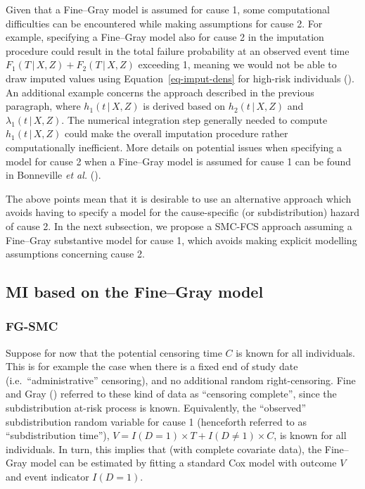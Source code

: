 \documentclass[
  letterpaper,
  paper=240mm:170mm,
  twoside=true,
  open=right,
  fontsize=10pt,
  pagesize=false,
  BCOR=15mm,
  DIV=14,
  headinclude=true,
  footinclude=false,
  headsepline=on]{scrbook}
\newcommand{\given}{\,|\,}
\begin{document}
Given that a Fine--Gray model is assumed for cause 1, some computational
difficulties can be encountered while making assumptions for cause 2.
For example, specifying a Fine--Gray model also for cause 2 in the
imputation procedure could result in the total failure probability at an
observed event time \(F_1(T \given X, Z) + F_2(T \given X, Z)\)
exceeding 1, meaning we would not be able to draw imputed values using
Equation~\ref{eq-imput-dens} for high-risk individuals
(). An additional example concerns the approach described in
the previous paragraph, where \(h_1(t \given X, Z)\) is derived based on
\(h_2(t \given X, Z)\) and \(\lambda_1(t \given X, Z)\). The numerical
integration step generally needed to compute \(h_1(t \given X, Z)\)
could make the overall imputation procedure rather computationally
inefficient. More details on potential issues when specifying a model
for cause 2 when a Fine--Gray model is assumed for cause 1 can be found
in Bonneville \emph{et al.}
().

The above points mean that it is desirable to use an alternative
approach which avoids having to specify a model for the cause-specific
(or subdistribution) hazard of cause 2. In the next subsection, we
propose a SMC-FCS approach assuming a Fine--Gray substantive model for
cause 1, which avoids making explicit modelling assumptions concerning
cause 2.

\subsection{MI based on the Fine--Gray model}\label{sec-subdist-time}

\subsubsection{FG-SMC}\label{sec-fg-smc}

Suppose for now that the potential censoring time \(C\) is known for all
individuals. This is for example the case when there is a fixed end of
study date (i.e.~``administrative'' censoring), and no additional random
right-censoring. Fine and Gray
() referred to
these kind of data as ``censoring complete'', since the subdistribution
at-risk process is known. Equivalently, the ``observed'' subdistribution
random variable for cause 1 (henceforth referred to as ``subdistribution
time''), \(V = I(D = 1) \times T + I(D \neq 1) \times C\), is known for
all individuals. In turn, this implies that (with complete covariate
data), the Fine--Gray model can be estimated by fitting a standard Cox
model with outcome \(V\) and event indicator \(I(D = 1)\).
\end{document}
